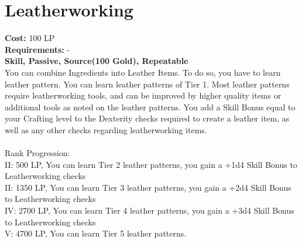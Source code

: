 \section{Leatherworking}\label{perk:leatherworking}
\textbf{Cost:} 100 LP\\
\textbf{Requirements:} -\\
\textbf{Skill, Passive, Source(100 Gold), Repeatable}\\
You can combine Ingredients into Leather Items.
To do so, you have to learn leather pattern.
You can learn leather patterns of Tier 1.
Most leather patterns require leatherworking tools, and can be improved by higher quality items or additional tools as noted on the leather patterns.
You add a Skill Bonus equal to your Crafting level to the Dexterity checks required to create a leather item, as well as any other checks regarding leatherworking items.\\
\\
Rank Progression:\\
II: 500 LP, You can learn Tier 2 leather patterns, you gain a +1d4 Skill Bonus to Leatherworking checks\\
II: 1350 LP, You can learn Tier 3 leather patterns, you gain a +2d4 Skill Bonus to Leatherworking checks\\
IV: 2700 LP, You can learn Tier 4 leather patterns, you gain a +3d4 Skill Bonus to Leatherworking checks\\
V: 4700 LP, You can learn Tier 5 leather patterns.\\